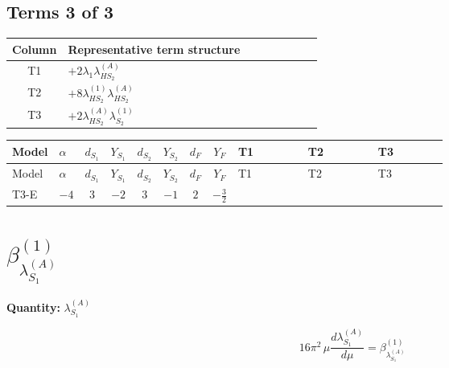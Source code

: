 \documentclass[8pt]{article}
\begin{document}
\begin{landscape}
\subsection*{Terms 3 of 3}
\begin{center}
\begin{tabular}{@{}c >{\raggedright\arraybackslash}p{0.82\linewidth}@{}}
\toprule
Column & Representative term structure \\
\midrule
T1 & \(\displaystyle +2 {\lambda_1} {\lambda_{HS_2}^{(A)}}\) \\
\midrule
T2 & \(\displaystyle +8 {\lambda_{HS_2}^{(1)}} {\lambda_{HS_2}^{(A)}}\) \\
\midrule
T3 & \(\displaystyle +2 {\lambda_{HS_2}^{(A)}} {\lambda_{S_2}^{(1)}}\) \\
\midrule
\bottomrule
\end{tabular}
\end{center}
\smallskip
\tiny
\begin{longtable}{@{}llcccccc >{\raggedright\arraybackslash}p{0.21\linewidth} >{\raggedright\arraybackslash}p{0.21\linewidth} >{\raggedright\arraybackslash}p{0.21\linewidth}@{}}
\toprule
Model & $\alpha$ & $d_{S_1}$ & $Y_{S_1}$ & $d_{S_2}$ & $Y_{S_2}$ & $d_F$ & $Y_F$ & T1 & T2 & T3 \\
\midrule
\endfirsthead
\toprule
Model & $\alpha$ & $d_{S_1}$ & $Y_{S_1}$ & $d_{S_2}$ & $Y_{S_2}$ & $d_F$ & $Y_F$ & T1 & T2 & T3 \\
\midrule
\endhead
T3-E & $-4$ & $3$ & $-2$ & $3$ & $-1$ & $2$ & $-\frac{3}{2}$ & \scriptsize\adjustbox{max width=\linewidth}{$\begin{gathered} +2 {\lambda_1} {\lambda_{HS_2}^{(A)}}\end{gathered}$} & \scriptsize\adjustbox{max width=\linewidth}{$\begin{gathered} +8 {\lambda_{HS_2}^{(1)}} {\lambda_{HS_2}^{(A)}}\end{gathered}$} & \scriptsize\adjustbox{max width=\linewidth}{$\begin{gathered} +2 {\lambda_{HS_2}^{(A)}} {\lambda_{S_2}^{(1)}}\end{gathered}$} \\
\midrule
\bottomrule
\end{longtable}
\clearpage
\section*{$\beta_{\lambda_{S_1}^{(A)}}^{(1)}$}
\noindent\textbf{Quantity: }$\lambda_{S_1}^{(A)}$\par\smallskip
\[16\pi^2\,\mu\frac{d \lambda_{S_1}^{(A)}}{d\mu}=\beta_{\lambda_{S_1}^{(A)}}^{(1)}\]

\end{landscape}
\end{document}
